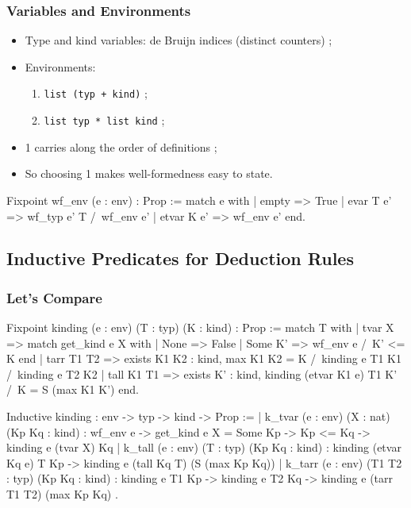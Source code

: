 \documentclass{beamer}
\begin{document}
\begin{frame}[fragile]

\frametitle{Variables and Environments}

\begin{itemize}
\item Type and kind variables: de Bruijn indices (distinct
  counters) ;
\item Environments:
  \begin{enumerate}
    \item \verb|list (typ + kind)| ;
    \item \verb|list typ * list kind| ;
  \end{enumerate}
\item 1 carries along the order of definitions ;
\item So choosing 1 makes well-formedness easy to state.
\end{itemize}

\begin{pyglist}
Fixpoint wf_env (e : env) : Prop :=
  match e with
    | empty      => True
    | evar T e'  => wf_typ e' T /\ wf_env e'
    | etvar K e' => wf_env e'
  end.
\end{pyglist}

\end{frame}

\subsection{Inductive Predicates for Deduction Rules}

\begin{frame}[fragile]

\frametitle{Let's Compare}

\begin{pyglist}[fontsize=\scriptsize]
Fixpoint kinding (e : env) (T : typ) (K : kind) : Prop :=
  match T with
  | tvar X => match get_kind e X with
              | None => False
              | Some K' => wf_env e /\ K' <= K
              end
  | tarr T1 T2 => exists K1 K2 : kind,
      max K1 K2 = K /\ kinding e T1 K1 /\ kinding e T2 K2
  | tall K1 T1 => exists K' : kind,
      kinding (etvar K1 e) T1 K' /\ K = S (max K1 K')
  end.
\end{pyglist}

\begin{pyglist}[fontsize=\scriptsize]
Inductive kinding : env -> typ -> kind -> Prop :=
| k_tvar (e : env) (X : nat) (Kp Kq : kind) :
  wf_env e -> get_kind e X = Some Kp -> Kp <= Kq -> kinding e (tvar X) Kq
| k_tall (e : env) (T : typ) (Kp Kq : kind) :
  kinding (etvar Kq e) T Kp -> kinding e (tall Kq T) (S (max Kp Kq))
| k_tarr (e : env) (T1 T2 : typ) (Kp Kq : kind) :
  kinding e T1 Kp -> kinding e T2 Kq -> kinding e (tarr T1 T2) (max Kp Kq)
.
\end{pyglist}

\end{frame}
\end{document}
